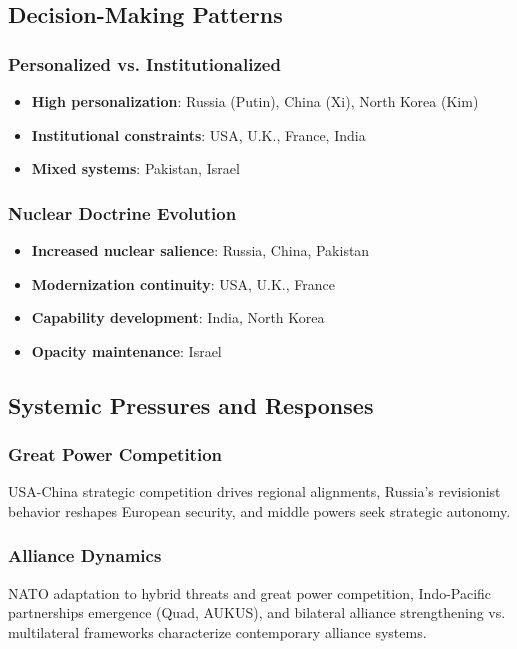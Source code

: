 \documentclass[a4paper, 11pt]{article}
\begin{document}
\subsection{Decision-Making Patterns}

\subsubsection{Personalized vs. Institutionalized}
\begin{itemize}
	\item \textbf{High personalization}: Russia (Putin), China (Xi), North Korea (Kim)
	\item \textbf{Institutional constraints}: USA, U.K., France, India
	\item \textbf{Mixed systems}: Pakistan, Israel
\end{itemize}

\subsubsection{Nuclear Doctrine Evolution}
\begin{itemize}
	\item \textbf{Increased nuclear salience}: Russia, China, Pakistan
	\item \textbf{Modernization continuity}: USA, U.K., France
	\item \textbf{Capability development}: India, North Korea
	\item \textbf{Opacity maintenance}: Israel
\end{itemize}

\subsection{Systemic Pressures and Responses}

\subsubsection{Great Power Competition}
USA-China strategic competition drives regional alignments, Russia's revisionist behavior reshapes European security, and middle powers seek strategic autonomy.

\subsubsection{Alliance Dynamics}
NATO adaptation to hybrid threats and great power competition, Indo-Pacific partnerships emergence (Quad, AUKUS), and bilateral alliance strengthening vs. multilateral frameworks characterize contemporary alliance systems.
\end{document}
